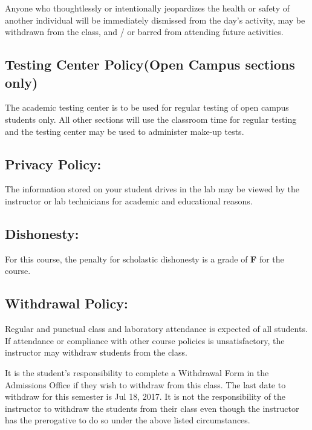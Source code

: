 \documentclass[a4paper]{article}
\begin{document}
Anyone who thoughtlessly or intentionally jeopardizes the health or safety of
another individual will be immediately dismissed from the day’s activity, may
be withdrawn from the class, and / or barred from attending future activities.


\subsection{Testing Center Policy(Open Campus sections only)%
  \label{testing-center-policy-open-campus-sections-only}%
}

The academic testing center is to be used for regular testing of open campus
students only. All other sections will use the classroom time for regular
testing and the testing center may be used to administer make-up tests.


\subsection{Privacy Policy:%
  \label{privacy-policy}%
}

The information stored on your student drives in the lab may be viewed by the
instructor or lab technicians for academic and educational reasons.


\subsection{Dishonesty:%
  \label{dishonesty}%
}

For this course, the penalty for scholastic dishonesty is a grade of \textbf{F} for
the course.


\subsection{Withdrawal Policy:%
  \label{withdrawal-policy}%
}

Regular and punctual class and laboratory attendance is expected of all
students.  If attendance or compliance with other course policies is
unsatisfactory, the instructor may withdraw students from the class.

It is the student's responsibility to complete a Withdrawal Form in the
Admissions Office if they wish to withdraw from this class. The last date to
withdraw for this semester is Jul 18, 2017. It is not the responsibility of the
instructor to withdraw the students from their class even though the instructor
has the prerogative to do so under the above listed circumstances.
\end{document}
